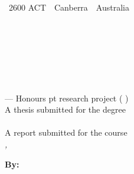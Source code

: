 
%
%


\thispagestyle{empty}



\ifStandardTitle %

\noindent
\begin{minipage}[t]{6cm}%
{\footnotesize%
 \\
~2600 ACT~\textbar~Canberra~\textbar~Australia}
\end{minipage}%
\hfill%
\begin{minipage}[b]{10cm}%
\hfill{}
\end{minipage}


\ \\[2em]
\phantom{x} \hfill
\begin{minipage}{58.75 mm}
\raggedright
\bfseries \School\\[.5em]
\mdseries%
\noindent\College
\end{minipage}\\[6 em]
\hfill

\noindent
\parbox{140mm}{\sffamily \bfseries \Huge %
\ProjectTitle%
}\\[.75 em]
{--- \ifHonoursThesis Honours \else \ProjectPoints{} pt research \fi project (\Semester{} \Year)}\\[3 em]


\ifHonoursThesis%
A thesis submitted for the degree\\
\emph{\Degree}\\[3 em]
\else%
A report submitted for the course\\
\emph{\CourseCode, \CourseName}\\[3 em]
\fi




\noindent
{\footnotesize \textbf{By:}}\\
\AuthorName\\[2em]



